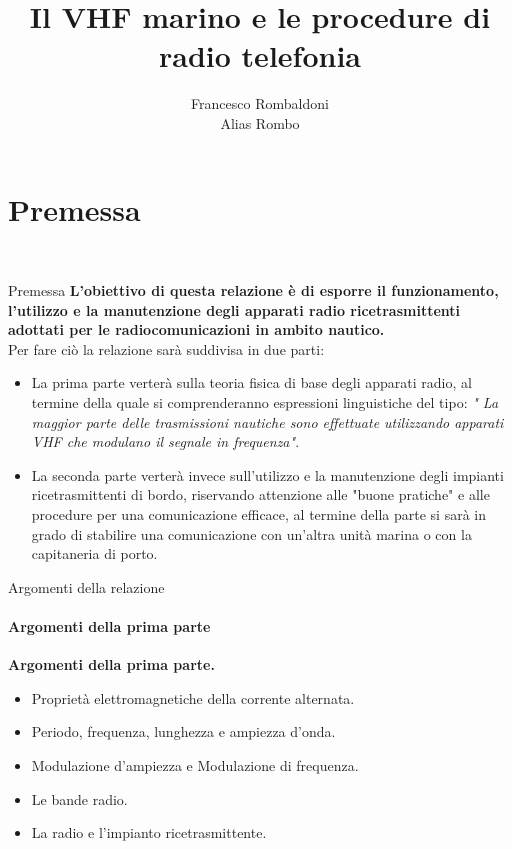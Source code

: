 \documentclass[aspectratio=169]{beamer}
\title{Il VHF marino e le procedure di radio telefonia}
\author{Francesco Rombaldoni\\
Alias Rombo}
\date{}
\institute{Università degli Studi di Urbino "Carlo Bo"}
\begin{document}
	
	\begin{frame} 
		\maketitle 		
	\end{frame}
	
	\begin{frame}[label = index]
		\tableofcontents
	\end{frame}

	\section{Premessa}
	\begin{frame}
		\centering{{\textcolor{blue!80}{\huge{\textbf{Premessa}}}}}\\
	\end{frame}

	\begin{frame}{Premessa}
		\textbf{L'obiettivo di questa relazione è di esporre il funzionamento, l'utilizzo e la manutenzione degli apparati radio ricetrasmittenti adottati per le radiocomunicazioni in ambito nautico.}\\
		\bigskip
		Per fare ciò la relazione sarà suddivisa in due parti:\\
		\begin{itemize}
			\item La prima parte verterà sulla teoria fisica di base degli apparati radio, al termine della quale si comprenderanno espressioni linguistiche del tipo: \emph{" La maggior parte delle trasmissioni nautiche sono effettuate utilizzando apparati VHF che modulano il segnale in frequenza"}.\\
			\item La seconda parte verterà invece sull'utilizzo e la manutenzione degli impianti ricetrasmittenti di bordo, riservando attenzione alle "buone pratiche" e alle procedure per una comunicazione efficace, al termine della parte si sarà in grado di stabilire una comunicazione con un'altra unità marina o con la capitaneria di porto.
		\end{itemize}
	\end{frame}

	\begin{frame}{Argomenti della relazione}
		\framesubtitle{Argomenti della prima parte}
		\textbf{Argomenti della prima parte.}
		\begin{itemize}
			\item Proprietà elettromagnetiche della corrente alternata.
			\item Periodo, frequenza, lunghezza e ampiezza d'onda.
			\item Modulazione d'ampiezza e Modulazione di frequenza.
			\item Le bande radio.
			\item La radio e l'impianto ricetrasmittente.
		\end{itemize}
	\end{frame}
\end{document}
